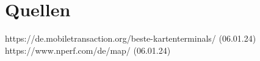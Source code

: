 \chapter{Quellen}
    https://de.mobiletransaction.org/beste-kartenterminals/ (06.01.24)
    https://www.nperf.com/de/map/ (06.01.24)